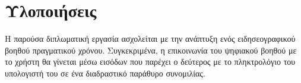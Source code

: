 \chapter{Υλοποιήσεις}
\label{chapter:implementations}
Η παρούσα διπλωματική εργασία ασχολείται με την ανάπτυξη ενός ειδησεογραφικού βοηθού πραγματικού χρόνου. Συγκεκριμένα, η επικοινωνία του ψηφιακού βοηθού με το χρήστη θα γίνεται μέσω εισόδων που παρέχει ο δεύτερος με το πληκτρολόγιο του υπολογιστή του σε ένα διαδραστικό παράθυρο συνομιλίας.












